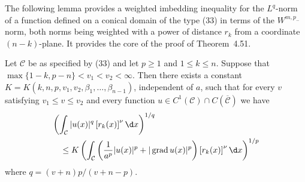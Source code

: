 The following lemma provides a weighted imbedding inequality for the $L^q$-norm of a function defined on a 
conical domain of the type (33) in terms of the $W^{m,p_{-}}$ norm, both norms being weighted with a power of 
distance $r_k$ from a coordinate $(n-k)$-plane. It provides the core of the proof of Theorem~4.51.


\begin{lemma}
  Let $\mathcal{C}$ be as specified by (33) and let $p \geq 1$ and $1 \leq k \leq n$.
  Suppose that $\max \{1-k, p-n\}<v_1<v_2<\infty$. Then there exists a constant
  $K=K\left(k, n, p, v_1, v_2, \beta_1, \ldots, \beta_{n-1}\right)$, independent of $a$,
  such that for every $v$ satisfying $v_1 \leq v \leq v_2$ and every function
  $u \in C^1(\mathcal{C}) \cap C(\overline{\mathcal{C}})$ we have
  \[
  \begin{aligned}
  & \left(\int_{\mathcal{C}}|u(x)|^q\left[r_k(x)\right]^\nu \d x\right)^{1 / q} \\
  & \quad \leq K\left(\int_{\mathcal{C}}\left(\frac{1}{a^p}|u(x)|^p+|\grad u(x)|^p\right)\left[r_k(x)\right]^\nu \d x\right)^{1 / p}
  \end{aligned}
  \]
  where $q=(v+n) p /(v+n-p)$.
\end{lemma}

